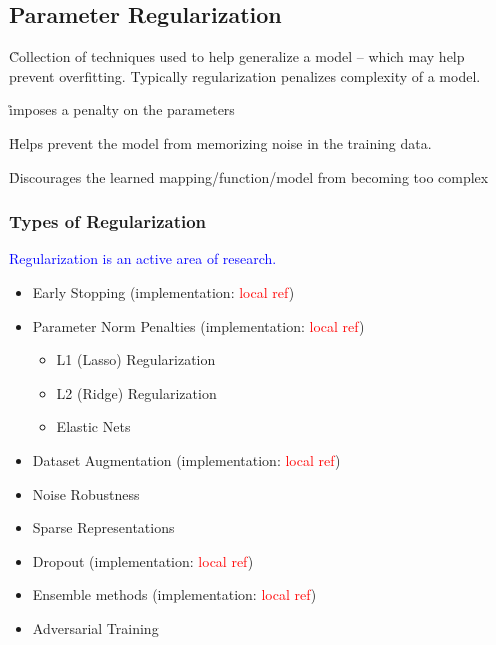 







\subsection{Parameter Regularization}

\r{Collection of techniques used to help generalize a model -- which may help prevent overfitting. Typically regularization penalizes complexity of a model.}



\r{imposes a penalty on the parameters}

\r{Helps prevent the model from memorizing noise in the training data.}

\r{Discourages the learned mapping/function/model from becoming too complex}


\subsubsection{Types of Regularization}

\textcolor{blue}{Regularization is an active area of research.}


\begin{itemize}[noitemsep,topsep=0pt]
	\item Early Stopping (implementation: \textcolor{red}{local ref})
	\item Parameter Norm Penalties (implementation: \textcolor{red}{local ref})
	\begin{itemize}[noitemsep,topsep=0pt]
		\item L1 (Lasso) Regularization
		\item L2 (Ridge) Regularization
		\item Elastic Nets
	\end{itemize}
	\item Dataset Augmentation (implementation: \textcolor{red}{local ref})
	\item Noise Robustness
	\item Sparse Representations
	\item Dropout (implementation: \textcolor{red}{local ref})
	\item Ensemble methods (implementation: \textcolor{red}{local ref})
	\item Adversarial Training
\end{itemize}




